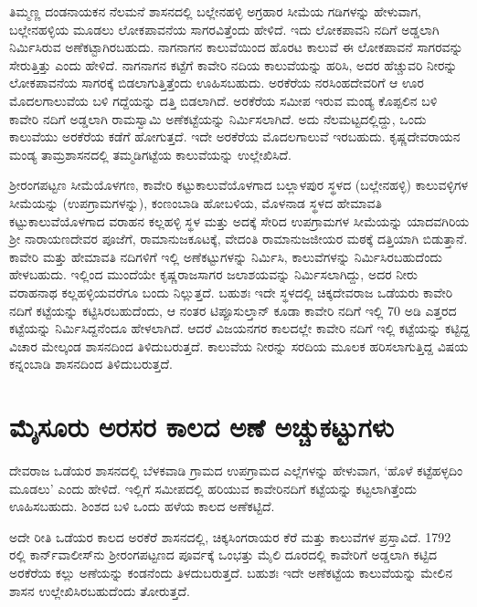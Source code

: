 ತಿಮ್ಮಣ್ಣ ದಂಡನಾಯಕನ ನೆಲಮನೆ ಶಾಸನದಲ್ಲಿ ಬಲ್ಲೇನಹಳ್ಳಿ ಅಗ್ರಹಾರ ಸೀಮೆಯ ಗಡಿಗಳನ್ನು ಹೇಳುವಾಗ, ಬಲ್ಲೇನಹಳ್ಳಿಯ ಮೂಡಲು ಲೋಕಪಾವನೆಯ ಸಾಗರವಿತ್ತೆಂದು ಹೇಳಿದೆ. ಇದು ಲೋಕಪಾವನಿ ನದಿಗೆ ಅಡ್ಡಲಾಗಿ ನಿರ್ಮಿಸಿರುವ ಅಣೆಕಟ್ಟಾಗಿರಬಹುದು. ನಾಗನಾಗನ ಕಾಲುವೆಯಿಂದ ಹೊರಟ ಕಾಲುವೆ ಈ ಲೋಕಪಾವನೆ ಸಾಗರವನ್ನು ಸೇರುತ್ತಿತ್ತು ಎಂದು ಹೇಳಿದೆ. ನಾಗನಾಗನ ಕಟ್ಟೆಗೆ ಕಾವೇರಿ ನದಿಯ ಕಾಲುವೆಯನ್ನು ಹರಿಸಿ, ಅದರ ಹೆಚ್ಚುವರಿ ನೀರನ್ನು ಲೋಕಪಾವನೆಯ ಸಾಗರಕ್ಕೆ ಬಿಡಲಾಗುತ್ತಿತ್ತೆಂದು ಊಹಿಸಬಹುದು. ಅರಕೆರೆಯ ನರಸಿಂಹದೇವರಿಗೆ ಆ ಊರ ಮೊದಲಗಾಲುವೆಯ ಬಳಿ ಗದ್ದೆಯನ್ನು ದತ್ತಿ ಬಿಡಲಾಗಿದೆ.  ಅರಕೆರೆಯ ಸಮೀಪ ಇರುವ ಮಂಡ್ಯ ಕೊಪ್ಪಲಿನ ಬಳಿ ಕಾವೇರಿ ನದಿಗೆ ಅಡ್ಡಲಾಗಿ ರಾಮಸ್ವಾಮಿ ಅಣೆಕಟ್ಟೆಯನ್ನು ನಿರ್ಮಿಸಲಾಗಿದೆ. ಅದು ನೆಲಮಟ್ಟದಲ್ಲಿದ್ದು, ಒಂದು ಕಾಲುವೆಯು ಅರಕೆರೆಯ ಕಡೆಗೆ ಹೋಗುತ್ತದೆ. ಇದೇ ಅರಕೆರೆಯ ಮೊದಲಗಾಲುವೆ ಇರಬಹುದು. ಕೃಷ್ಣದೇವರಾಯನ ಮಂಡ್ಯ ತಾಮ್ರಶಾಸನದಲ್ಲಿ ತಮ್ಮಡಿಗಟ್ಟೆಯ ಕಾಲುವೆಯನ್ನು ಉಲ್ಲೇಖಿಸಿದೆ.

ಶ‍್ರೀರಂಗಪಟ್ಟಣ ಸೀಮೆಯೊಳಗಣ, ಕಾವೇರಿ ಕಟ್ಟುಕಾಲುವೆಯೊಳಗಾದ ಬಲ್ಲಾಳಪುರ ಸ್ಥಳದ (ಬಲ್ಲೇನಹಳ್ಳಿ) ಕಾಲುವಳ್ಳಿಗಳ ಸೀಮೆಯನ್ನು (ಉಪಗ್ರಾಮಗಳನ್ನು), ಕಂಣಂಬಾಡಿ ಹೋಬಳಿಯ, ಮೊಳನಾಡ ಸ್ಥಳದ ಹೇಮಾವತಿ ಕಟ್ಟುಕಾಲುವೆ\-ಯೊಳಗಾದ ವರಾಹನ ಕಲ್ಲಹಳ್ಳಿ ಸ್ಥಳ ಮತ್ತು ಅದಕ್ಕೆ ಸೇರಿದ ಉಪಗ್ರಾಮಗಳ ಸೀಮೆಯನ್ನು ಯಾದವಗಿರಿಯ ಶ‍್ರೀ ನಾರಾಯಣದೇವರ ಪೂಜೆಗೆ, ರಾಮಾನುಜಕೂಟಕ್ಕೆ, ವೇದಂತಿ ರಾಮಾನುಜಜೀಯರ ಮಠಕ್ಕೆ ದತ್ತಿಯಾಗಿ ಬಿಡುತ್ತಾನೆ. ಕಾವೇರಿ ಮತ್ತು ಹೇಮಾವತಿ ನದಿಗಳಿಗೆ ಇಲ್ಲಿ ಅಣೆಕಟ್ಟುಗಳನ್ನು ನಿರ್ಮಿಸಿ, ಕಾಲುವೆಗಳನ್ನು ನಿರ್ಮಿಸಿರಬಹುದೆಂದು ಹೇಳಬಹುದು. ಇಲ್ಲಿಂದ ಮುಂದೆಯೇ ಕೃಷ್ಣರಾಜಸಾಗರ ಜಲಾಶಯವನ್ನು ನಿರ್ಮಿಸಲಾಗಿದ್ದು, ಅದರ ನೀರು ವರಾಹನಾಥ ಕಲ್ಲಹಳ್ಳಿಯವರೆಗೂ ಬಂದು ನಿಲ್ಲುತ್ತದೆ. ಬಹುಶಃ ಇದೇ ಸ್ಥಳದಲ್ಲಿ ಚಿಕ್ಕದೇವರಾಜ ಒಡೆಯರು ಕಾವೇರಿ ನದಿಗೆ ಕಟ್ಟೆಯನ್ನು ಕಟ್ಟಿಸಿರಬಹುದೆಂದು, ಆ ನಂತರ ಟಿಪ್ಪೂಸುಲ್ತಾನ್​ ಕೂಡಾ ಕಾವೇರಿ ನದಿಗೆ ಇಲ್ಲಿ 70 ಅಡಿ ಎತ್ತರದ ಕಟ್ಟೆಯನ್ನು ನಿರ್ಮಿಸಿದ್ದನೆಂದೂ ಹೇಳಲಾಗಿದೆ. ಆದರೆ ವಿಜಯನಗರ ಕಾಲದಲ್ಲೇ ಕಾವೇರಿ ನದಿಗೆ ಇಲ್ಲಿ ಕಟ್ಟೆಯನ್ನು ಕಟ್ಟಿದ್ದ ವಿಚಾರ ಮೇಲ್ಕಂಡ ಶಾಸನದಿಂದ ತಿಳಿದುಬರುತ್ತದೆ. ಕಾಲುವೆಯ ನೀರನ್ನು ಸರದಿಯ ಮೂಲಕ ಹರಿಸಲಾಗುತ್ತಿದ್ದ ವಿಷಯ ಕನ್ನಂಬಾಡಿ ಶಾಸನದಿಂದ ತಿಳಿದುಬರುತ್ತದೆ.


\section{ಮೈಸೂರು ಅರಸರ ಕಾಲದ ಅಣೆ ಅಚ್ಚುಕಟ್ಟುಗಳು}

ದೇವರಾಜ ಒಡೆಯರ ಶಾಸನದಲ್ಲಿ ಬೆಳಕವಾಡಿ ಗ್ರಾಮದ ಉಪಗ್ರಾಮದ ಎಲ್ಲೆಗಳನ್ನು ಹೇಳುವಾಗ, ‘ಹೊಳೆ ಕಟ್ಟೆಹಳ್ಳದಿಂ ಮೂಡಲು’ ಎಂದು ಹೇಳಿದೆ. ಇಲ್ಲಿಗೆ ಸಮೀಪದಲ್ಲಿ ಹರಿಯುವ ಕಾವೇರಿನದಿಗೆ ಕಟ್ಟೆಯನ್ನು ಕಟ್ಟಲಾಗಿತ್ತೆಂದು ಊಹಿಸ\-ಬಹುದು. ಶಿಂಶದ ಬಳಿ ಒಂದು ಹಳೆಯ ಕಾಲದ ಅಣೆಕಟ್ಟಿದೆ.

ಅದೇ ರೀತಿ ಒಡೆಯರ ಕಾಲದ ಅರಕೆರೆ ಶಾಸನದಲ್ಲಿ, ಚಿಕ್ಕಸಿಂಗರಾಯರ ಕೆರೆ ಮತ್ತು ಕಾಲುವೆಗಳ ಪ್ರಸ್ತಾವಿದೆ. 1792 ರಲ್ಲಿ ಕಾರ್ನ್​ವಾಲೀಸ್​ನು ಶ‍್ರೀರಂಗಪಟ್ಟಣದ ಪೂರ್ವಕ್ಕೆ ಒಂಭತ್ತು ಮೈಲಿ ದೂರದಲ್ಲಿ ಕಾವೇರಿಗೆ ಅಡ್ಡಲಾಗಿ ಕಟ್ಟಿದ ಅರಕೆರೆಯ ಕಲ್ಲು ಅಣೆಯನ್ನು ಕಂಡನೆಂದು ತಿಳದುಬರುತ್ತದೆ. ಬಹುಶಃ ಇದೇ ಅಣೆಕಟ್ಟೆಯ ಕಾಲುವೆಯನ್ನು ಮೇಲಿನ ಶಾಸನ ಉಲ್ಲೇಖಿಸಿರಬಹುದೆಂದು ತೋರುತ್ತದೆ.

